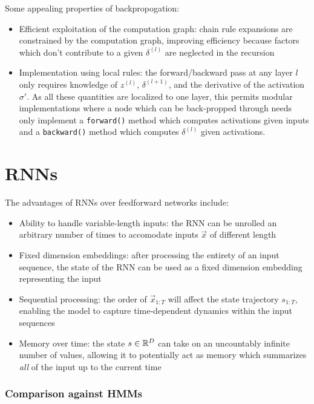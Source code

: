 Some appealing properties of backpropogation:
\begin{itemize}
    \item Efficient exploitation of the computation graph: chain rule expansions
        are constrained by the computation graph, improving efficiency
        because factors which don't contribute to a given $\delta^{(l)}$
        are neglected in the recursion
    \item Implementation using local rules: the forward/backward pass
        at any layer $l$ only requires knowledge of $z^{(l)}$, $\delta^{(l+1)}$,
        and the derivative of the activation $\sigma'$. As all these quantities are localized
        to one layer, this permits modular implementations where a node which can be back-propped
        through needs only implement a \texttt{forward()} method which computes activations
        given inputs and a \texttt{backward()} method which computes $\delta^{(l)}$ given
        activations.
\end{itemize}


\section{RNNs}

The advantages of RNNs over feedforward networks include:
\begin{itemize}
    \item Ability to handle variable-length inputs: the RNN can be unrolled an arbitrary
        number of times to accomodate inputs $\vec{x}$ of different length
    \item Fixed dimension embeddings: after processing the entirety of an input
        sequence, the state of the RNN can be used as a fixed dimension embedding
        representing the input
    \item Sequential processing: the order of $\vec{x}_{1:T}$ will affect the state
        trajectory $s_{1:T}$, enabling the model to capture time-dependent dynamics
        within the input sequences
    \item Memory over time: the state $s \in \mathbb{R}^D$ can take on an uncountably infinite
        number of values, allowing it to potentially act as memory which summarizes
        \emph{all} of the input up to the current time
\end{itemize}

\subsubsection{Comparison against HMMs}

